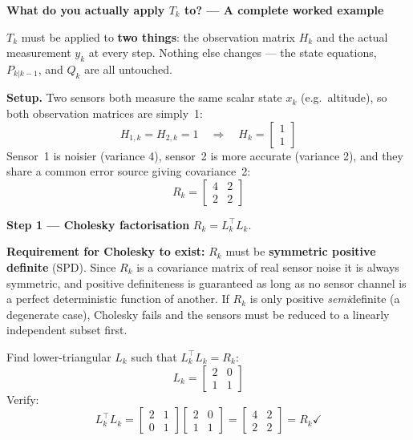 \documentclass[12pt, a4paper]{article}
\begin{document}
\begin{notebox}
  \textbf{What do you actually apply $T_k$ to? --- A complete worked example}

  $T_k$ must be applied to \textbf{two things}: the observation matrix
  $H_k$ and the actual measurement $y_k$ at every step.
  Nothing else changes --- the state equations, $P_{k|k-1}$, and $Q_k$
  are all untouched.

  \medskip
  \textbf{Setup.}
  Two sensors both measure the same scalar state $x_k$
  (e.g.\ altitude), so both observation matrices are simply~1:
  \[
    H_{1,k} = H_{2,k} = 1
    \quad\Longrightarrow\quad
    H_k = \begin{bmatrix} 1 \\ 1 \end{bmatrix}
  \]
  Sensor~1 is noisier (variance 4), sensor~2 is more accurate (variance 2),
  and they share a common error source giving covariance~2:
  \[
    R_k = \begin{bmatrix} 4 & 2 \\ 2 & 2 \end{bmatrix}
  \]

  \textbf{Step 1 --- Cholesky factorisation} $R_k = L_k^\top L_k$.

  \textbf{Requirement for Cholesky to exist:} $R_k$ must be
  \textbf{symmetric positive definite} (SPD).
  Since $R_k$ is a covariance matrix of real sensor noise it is always
  symmetric, and positive definiteness is guaranteed as long as no sensor
  channel is a perfect deterministic function of another.
  If $R_k$ is only positive \emph{semi}definite (a degenerate case),
  Cholesky fails and the sensors must be reduced to a linearly independent
  subset first.

  Find lower-triangular $L_k$ such that $L_k^\top L_k = R_k$:
  \[
    L_k = \begin{bmatrix} 2 & 0 \\ 1 & 1 \end{bmatrix}
  \]
  Verify:
  \[
    L_k^\top L_k
    = \begin{bmatrix} 2 & 1 \\ 0 & 1 \end{bmatrix}
      \begin{bmatrix} 2 & 0 \\ 1 & 1 \end{bmatrix}
    = \begin{bmatrix} 4 & 2 \\ 2 & 2 \end{bmatrix}
    = R_k \checkmark
  \]


\end{notebox}
\end{document}
